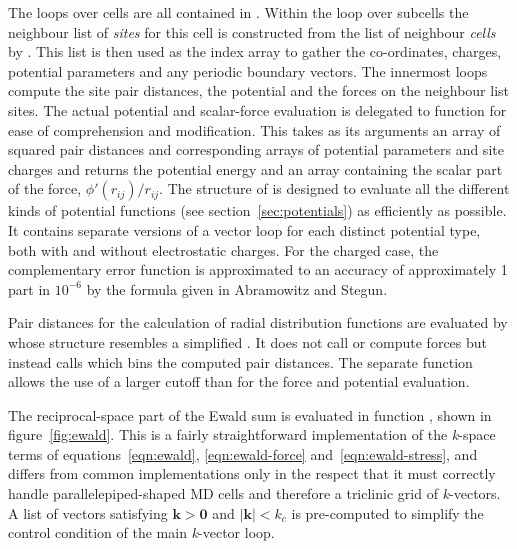 \documentclass[a4paper,twoside]{report}
\providecommand{\bm}[1]{\mathbf{#1}}
\begin{document}
The loops over cells are all contained in .
Within the loop over subcells the neighbour list of \emph{sites} for
this cell is constructed from the list of neighbour \emph{cells} by
.  This list is then used as the index
array to gather the co-ordinates, charges, potential parameters and
any periodic boundary vectors.  The innermost loops compute the site
pair distances, the potential and the forces on the neighbour list
sites.  The actual potential and scalar-force evaluation is delegated
to function  for ease of comprehension and modification.
This takes as its arguments an array of squared pair distances and
corresponding arrays of potential parameters and site charges and
returns the potential energy and an array containing the scalar part
of the force, $\phi'(r_{ij})/r_{ij}$. The structure of 
is designed to evaluate all the different kinds of potential functions
(see section~\ref{sec:potentials}) as efficiently as possible.  It
contains separate versions of a vector loop for each distinct
potential type, both with and without electrostatic charges.  For the
charged case, the complementary error function is approximated to an
accuracy of approximately 1 part in $10^{-6}$ by the formula given in
Abramowitz and Stegun\cite[section 7.1.26]{abramowitz:70}.

Pair distances for the calculation of radial distribution functions
are evaluated by  whose structure
resembles a simplified . It does not call
 or compute forces but instead calls
 which bins the computed pair distances. The
separate function allows the use of a larger cutoff than for the force
and potential evaluation.

The reciprocal-space part of the Ewald sum is evaluated in function
, shown in figure~\ref{fig:ewald}.  This is a fairly
straightforward implementation of the \emph{k}-space terms of
equations~\ref{eqn:ewald}, \ref{eqn:ewald-force}
and~\ref{eqn:ewald-stress}, and differs from common implementations
only in the respect that it must correctly handle
parallelepiped-shaped MD cells and therefore a triclinic grid of
\emph{k}-vectors.  A list of vectors satisfying $\bm{k} > \bm{0}$ and
$|\bm{k}| < k_c$ is pre-computed to simplify the control condition of
the main \emph{k}-vector loop.
\end{document}
